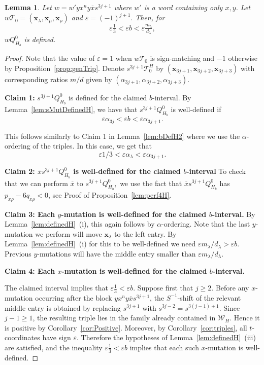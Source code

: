 \documentclass[11pt, reqno]{amsart}
\newtheorem{lemma}[thm]{Lemma}
\theoremstyle{remark}
\numberwithin{equation}{subsection}
\numberwithin{figure}{section}
\theoremstyle{customremark}
\newcommand{\Tt}{\mathcal{T}}
\newcommand{\ovx}{{\ov{x}}}
\newcommand{\ov}{\overline}
\newcommand{\al}{{\alpha}}
\newcommand{\la}{{\lambda}}
\newcommand{\eps}{\varepsilon}
\begin{document}
\begin{lemma} \label{lem:bDefH3}
Let $w=w'yx^ny\ov{x}s^{3j+1}$ where $w'$ is a word containing only $x,y$. Let $w\Tt_0=(\bm{x}_\la,\bm{x}_\mu,\bm{x}_\rho)$ and $\eps=(-1)^{j+1}.$ Then, for
\[\eps\tfrac13<\eps b< \eps\tfrac{m_\la}{d_\la},\]
 $wQ_{H_b}^0$ is defined. 
\end{lemma}
\begin{proof}
Note that the value of $\eps=1$ when $w\Tt_0$ is sign-matching and $-1$ otherwise by Proposition~\ref{prop:genTrip}. 
Denote $s^{3j+1}\Tt_0^H$ by $(\bm{x}_{3j+1},\bm{x}_{3j+2},\bm{x}_{3j+3})$ with corresponding ratios $m/d$ given by $(\al_{3j+1},\al_{3j+2},\al_{3j+3})$. 


{\bf Claim 1:} $s^{3j+1}Q_{H_b}^0$ is defined for the claimed $b$-interval. 
By Lemma~\ref{lem:sMutDefinedH}, we have that $s^{3j+1}Q_{H_b}^0$ is well-defined if  
    \[ \eps \al_{3j} < \eps b < \eps \al_{3j+1}.\]

This follows similarly to Claim 1 in Lemma~\ref{lem:bDefH2} where we use the $\al$-ordering of the triples. In this case, we get that
\[ \eps 1/3<\eps \al_\la <\eps \al_{3j+1}.\]



        {\bf Claim 2: $\ov{x}s^{3j+1}Q_{H_b}^0$ is well-defined for the claimed $b$-interval}
        To check that we can perform $\ov{x}$ to $s^{3j+1}Q_{H_b}^0,$ we use the fact that $\ov{x}s^{3j+1}Q_{H_b}^0$ has $p_{\ovx\rho}-6q_{\ovx\rho}<0$, see Proof of Proposition~\ref{lem:perf4H}. 

        {\bf Claim 3: Each $y$-mutation is well-defined for the claimed $b$-interval.}
        By Lemma~\ref{lem:definedH}~(i), this again follows by $\al$-ordering. Note that the last $y$-mutation we perform will move $\bm{x}_\la$ to the left entry. By Lemma~\ref{lem:definedH}~(i) for this to be well-defined we need $\eps m_\la/d_\la>\eps b.$ Previous $y$-mutations will have the middle entry smaller than $\eps m_\la/d_\la.$
        
     

        {\bf Claim 4: Each $x$-mutation is well-defined for the claimed $b$-interval.}

The claimed interval implies that $\eps\frac13<\eps b.$
Suppose first that \(j\ge 2\). Before any \(x\)-mutation occurring after the
block \(yx^ny\ov{x}s^{3j+1}\), the \(S^{-1}\)-shift of the relevant middle
entry is obtained by replacing \(s^{3j+1}\) with \(s^{3j-2}=s^{3(j-1)+1}\).
Since \(j-1\ge1\), the resulting triple lies in the family already contained
in \(\mathcal W_H\). Hence it is positive by Corollary~\ref{cor:Positive}.
Moreover, by Corollary~\ref{cor:triples}, all \(t\)-coordinates have sign
\(\eps\). Therefore the hypotheses of Lemma~\ref{lem:definedH}~(iii)
are satisfied, and the inequality $\eps\frac13<\eps b$
implies that each such \(x\)-mutation is well-defined.


\end{proof}
\end{document}
